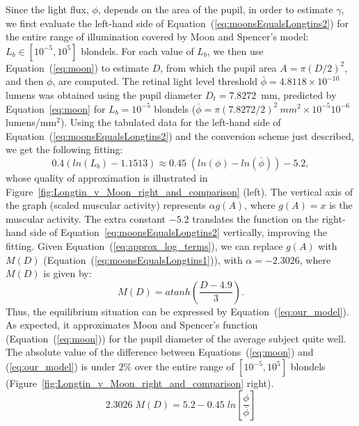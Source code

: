 \documentclass{acmtog}
\begin{document}
Since the light flux, $\phi$, depends on the area of the pupil, in order to estimate $\gamma$, we first evaluate the
left-hand side of Equation~(\ref{eq:moonsEqualsLongtins2}) for the entire range of illumination covered by  Moon and
Spencer's model: $L_b \in [10^{-5}, 10^{5}]$ blondels. For each value of $L_b$, we then use Equation~(\ref{eq:moon}) to
estimate $D$, from which the pupil area $A = \pi(D/2)^2$, and then $\phi$, are computed. The retinal light level threshold
$\bar{\phi} = 4.8118\times10^{-10}$ lumens was obtained using the pupil diameter $D_t=7.8272$~mm, predicted by 
Equation~\ref{eq:moon} for $L_b = 10^{-5}$ blondels ($\bar{\phi} = \pi(7.8272 / 2)^2~mm^2 \times 10^{-5}
10^{-6}$ lumens/mm$^2$). Using the tabulated data for the left-hand side of Equation~(\ref{eq:moonsEqualsLongtins2}) and the
conversion scheme just described, we get the following fitting: 
\begin{equation}
  0.4 ( {{ln}}(L_{b}) -1.1513)      \approx  0.45 \; ({{ln}}(\phi) - {{ln}}(\bar{\phi})) -5.2,
 \label{eq:approx_log_terms}
\end{equation}
whose quality of  approximation is illustrated in Figure~\ref{fig:Longtin_v_Moon_right_and_comparison} (left). The
vertical axis of the graph (scaled muscular activity) represents $\alpha g(A)$, where $g(A) = x$ is the muscular activity.
The extra constant $-5.2$ translates the function on the right-hand side of Equation~\ref{eq:moonsEqualsLongtins2}
vertically, improving the fitting.  Given Equation~(\ref{eq:approx_log_terms}), we can replace $g(A)$ with $M(D)$
(Equation~(\ref{eq:moonsEqualsLongtins1})), with $\alpha = -2.3026$, where $M(D)$ is given by:
\begin{equation}
  M(D) = {{atanh}} \left( \frac{D-4.9}{3} \right).
  \label{eq:our_function_for_elasto_mechanical_prop}
\end{equation}
Thus, the equilibrium situation can be expressed by Equation~(\ref{eq:our_model}). As expected, it approximates  Moon
and Spencer's function (Equation~(\ref{eq:moon})) for the pupil diameter of the average subject quite well. The absolute
value of the difference between Equations~(\ref{eq:moon}) and (\ref{eq:our_model}) is under $2\%$  over the entire range of
$[10^{-5}, 10^{5}]$ blondels (Figure~\ref{fig:Longtin_v_Moon_right_and_comparison} right). 
\begin{equation}
\label{eq:our_model}
  2.3026 \; M(D)  =  5.2 - 0.45 \; {{ln}} \left[\frac{\phi}{\bar{\phi}} \right]
\end{equation}
%
\end{document}

